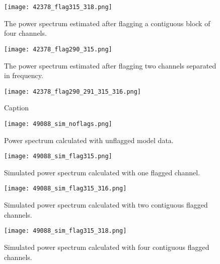 \documentclass[12pt]{article}
\begin{document}
\begin{figure}[p]
	\centering
	\texttt{[image: 42378\_flag315\_318.png]}
	\caption[Power spectrum calculated with flagged time integrations and four contiguous flagged channels]{The power spectrum estimated after flagging a contiguous block of four channels.}
	\label{fig:flag_chan315_318}
\end{figure}

\begin{figure}[p]
	\centering
	\texttt{[image: 42378\_flag290\_315.png]}
	\caption[Power spectrum calculated with flagged time integrations and two non-contiguous flagged channels]{The power spectrum estimated after flagging two channels separated in frequency.}
	\label{fig:flag_chan290_315}
\end{figure}

\begin{figure}[p]
	\centering
	\texttt{[image: 42378\_flag290\_291\_315\_316.png]}
	\caption[Power spectrum calculated with flagged time integrations and four flagged channels (two blocks of two channels)]{Caption}
	\label{fig:flag_chan290_291_315_316}
\end{figure}

\begin{figure}[p]
	\centering
	\texttt{[image: 49088\_sim\_noflags.png]}
	\caption[Original model power spectrum (only foregrounds)]{Power spectrum calculated with unflagged model data.}
	\label{fig:sim_noflags}
\end{figure}

\begin{figure}[p]
	\centering
	\texttt{[image: 49088\_sim\_flag315.png]}
	\caption[Model power spectrum calculated with flagged time integrations and one flagged channel]{Simulated power spectrum calculated with one flagged channel.}
	\label{fig:sim_flag_chan315}
\end{figure}

\begin{figure}[p]
	\centering
	\texttt{[image: 49088\_sim\_flag315\_316.png]}
	\caption[Model power spectrum calculated with flagged time integrations and two contiguous flagged channels]{Simulated power spectrum calculated with two contiguous flagged channels.}
	\label{fig:sim_flag_chan315_316}
\end{figure}

\begin{figure}[p]
	\centering
	\texttt{[image: 49088\_sim\_flag315\_318.png]}
	\caption[Model power spectrum calculated with flagged time integrations and four contiguous flagged channels]{Simulated power spectrum calculated with four contiguous flagged channels.}
	\label{fig:sim_flag_chan315_318}
\end{figure}
\end{document}
